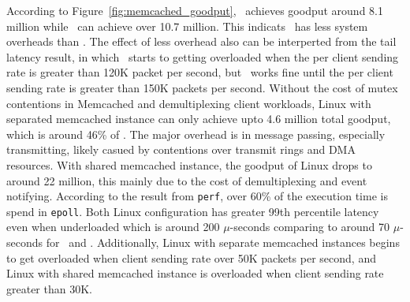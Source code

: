 According to Figure~\ref{fig:memcached_goodput}, \cos\ achieves goodput around 8.1 million while \name\ can achieve over 10.7 million.
This indicats \name\ has less system overheads than \cos .
The effect of less overhead also can be interperted from the tail latency result, in which \cos\ starts to getting overloaded when the per client sending rate is greater than 120K packet per second, but \name\ works fine until the per client sending rate is greater than 150K packets per second.
Without the cost of mutex contentions in Memcached and demultiplexing client workloads, Linux with separated memcached instance can only achieve upto 4.6 million total goodput, which is around 46\% of \name .
The major overhead is in message passing, especially transmitting, likely casued by contentions over transmit rings and DMA resources.
With shared memcached instance, the goodput of Linux drops to around 22 million, this mainly due to the cost of demultiplexing and event notifying.
According to the result from {\tt perf}, over 60\% of the execution time is spend in {\tt epoll}.
Both Linux configuration has greater 99th percentile latency even when underloaded which is around 200 $\mu$-seconds comparing to around 70 $\mu$-seconds for \cos\ and \name .
Additionally, Linux with separate memcached instances begins to get overloaded when client sending rate over 50K packets per second, and Linux with shared memcached instance is overloaded when client sending rate greater than 30K.


